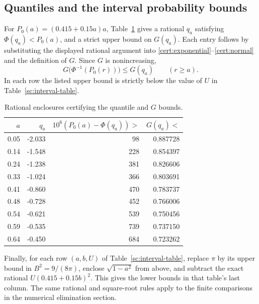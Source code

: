 \subsection{Quantiles and the interval probability bounds}
For \(P_0(a)=(0.415+0.15a)a\), Table~\ref{cert:quantiles}
gives a rational \(q_a\) satisfying \(\Phi(q_a)<P_0(a)\), and a
strict upper bound on \(G(q_a)\). Each entry follows by substituting
the displayed rational argument into
\eqref{cert:exponential}--\eqref{cert:normal} and the definition of
\(G\). Since \(G\) is nonincreasing,
\[
 G\bigl(\Phi^{-1}(P_0(r))\bigr)\le G(q_a)
 \qquad(r\ge a).
\]
In each row the listed upper bound is strictly below the value of
\(U\) in Table~\ref{sc:interval-table}.

\begin{table}[ht]
\centering
\begin{tabular}{rrrr}
\hline
\(a\)&\(q_a\)&\(10^6(P_0(a)-\Phi(q_a))>\)&\(G(q_a)<\)\\
\hline
0.05&-2.033&98&0.887728\\
0.14&-1.548&228&0.854397\\
0.24&-1.238&381&0.826606\\
0.33&-1.024&366&0.803691\\
0.41&-0.860&470&0.783737\\
0.48&-0.728&452&0.766006\\
0.54&-0.621&539&0.750456\\
0.59&-0.535&739&0.737150\\
0.64&-0.450&684&0.723262\\
\hline
\end{tabular}
\caption{Rational enclosures certifying the quantile and \(G\) bounds.}
\label{cert:quantiles}
\end{table}

Finally, for each row \((a,b,U)\) of
Table~\ref{sc:interval-table}, replace \(\pi\) by its upper bound in
\(B^2=9/(8\pi)\), enclose \(\sqrt{1-a^2}\) from above, and subtract
the exact rational \(U(0.415+0.15b)^2\). This gives the lower bounds
in that table's last column. The same rational and square-root rules
apply to the finite comparisons in the numerical elimination section.
